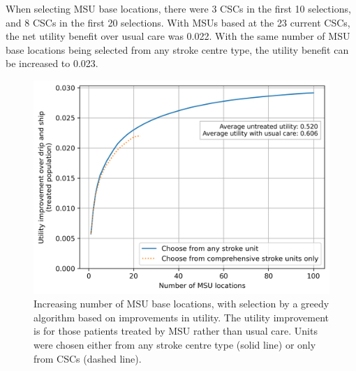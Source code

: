 When selecting MSU base locations, there were 3 CSCs in the first 10 selections, and 8 CSCs in the first 20 selections. With MSUs based at the 23 current CSCs, the net utility benefit over usual care was 0.022. With the same number of MSU base locations being selected from any stroke centre type, the utility benefit can be increased to 0.023.

\begin{figure}[h]
    \centering
    \includegraphics[width=0.5\linewidth]{images/msu_advantages_greedy.png}
    \caption{Increasing number of MSU base locations, with selection by a greedy algorithm based on improvements in utility. The utility improvement is for those patients treated by MSU rather than usual care. Units were chosen either from any stroke centre type (solid line) or only from CSCs (dashed line).}
    \label{fig:greedy}
\end{figure}


